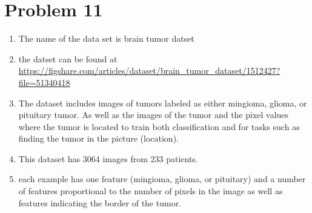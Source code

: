 \documentclass[11pt]{article}
\newcommand{\solution}[1]{{{\color{blue}{\bf Solution:} {#1}}}}
\begin{document}
\section{Problem 11}
 \solution{
     \begin{enumerate}
         \item The name of the data set is brain tumor datset
         \item the datset can be found at \url{https://figshare.com/articles/dataset/brain_tumor_dataset/1512427?file=51340418}
         \item The dataset includes images of tumors labeled as either mingioma, glioma, or pituitary tumor. As well as the images of the tumor and the pixel values where the tumor is located to train both 
             classification and for tasks such as finding the tumor in the picture (location).
         \item This dataset has 3064 images from 233 patients.
         \item each example has one feature (mingioma, glioma, or pituitary) and a number of features proportional to the number of pixels in the image
             as well as features indicating the border of the tumor.
     \end{enumerate}
 }
\end{document}
